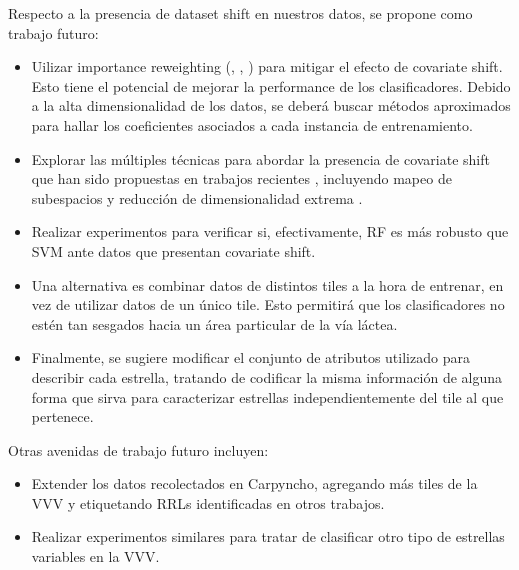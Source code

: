 Respecto a la presencia de dataset shift en nuestros datos, se propone como trabajo futuro:

\begin{itemize}
\item Uilizar importance reweighting (\cite{kouw2019introduction}, \cite{non-stationary} , \cite{GeetaDharani2019CovariateSA}) para mitigar el efecto de covariate shift. Esto tiene el potencial de mejorar la performance de los clasificadores. Debido a la alta dimensionalidad de los datos, se deberá buscar métodos aproximados para hallar los coeficientes asociados a cada instancia de entrenamiento.
\item Explorar las múltiples técnicas para abordar la presencia de covariate shift que han sido propuestas en trabajos recientes \cite{GeetaDharani2019CovariateSA}, incluyendo mapeo de subespacios \cite{kouw2019introduction} y reducción de dimensionalidad extrema \cite{wang2018extreme}.
\item Realizar experimentos para verificar si, efectivamente, RF es más robusto que SVM ante datos que presentan covariate shift.
\item Una alternativa es combinar datos de distintos tiles a la hora de entrenar, en vez de utilizar datos de un único tile. Esto permitirá que los clasificadores no estén tan sesgados hacia un área particular de la vía láctea. 
\item Finalmente, se sugiere modificar el conjunto de atributos utilizado para describir cada estrella, tratando de codificar la misma información de alguna forma que sirva para caracterizar estrellas independientemente del tile al que pertenece.
\end{itemize}

Otras avenidas de trabajo futuro incluyen:

\begin{itemize}
\item Extender los datos recolectados en Carpyncho, agregando más tiles de la VVV y etiquetando RRLs identificadas en otros trabajos.
\item Realizar experimentos similares para tratar de clasificar otro tipo de estrellas variables en la VVV.
\end{itemize}



